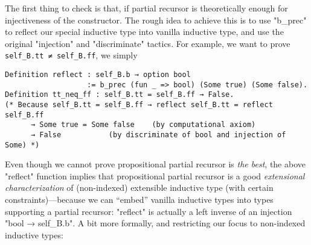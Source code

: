 The first thing to check is that, if partial recursor is theoretically enough for injectiveness of the constructor. The rough idea to achieve this
is to use "b_prec" to reflect our special inductive type into vanilla
inductive type, and use the original "injection" and "discriminate"
tactics. For example, we want to prove \texttt{self_B.tt ≠
self_B.ff}, we simply 
\begin{verbatim}
Definition reflect : self_B.b → option bool 
                   := b_prec (fun _ => bool) (Some true) (Some false).
Definition tt_neq_ff : self_B.tt = self_B.ff → False.
(* Because self_B.tt = self_B.ff → reflect self_B.tt = reflect self_B.ff 
      → Some true = Some false    (by computational axiom)
      → False           (by discriminate of bool and injection of Some) *)
\end{verbatim}


Even though we cannot prove propositional partial recursor is \textit{the best},
the above "reflect" function implies that propositional partial
recursor is a good \textit{extensional characterization} of (non-indexed) extensible inductive type (with certain constraints)---because we can ``embed'' vanilla inductive types into
types supporting a partial recursor: "reflect" is actually a left
inverse of an injection "bool → self_B.b". A bit more formally, and
restricting our focus to non-indexed inductive types:

